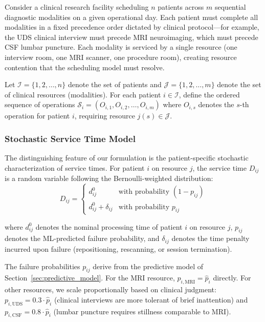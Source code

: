 \documentclass[msom,blindrev]{informs3}
\begin{document}
Consider a clinical research facility scheduling $n$ patients across $m$ sequential diagnostic modalities on a given operational day. Each patient must complete all modalities in a fixed precedence order dictated by clinical protocol---for example, the UDS clinical interview must precede MRI neuroimaging, which must precede CSF lumbar puncture. Each modality is serviced by a single resource (one interview room, one MRI scanner, one procedure room), creating resource contention that the scheduling model must resolve.

Let $\mathcal{I} = \{1, 2, \ldots, n\}$ denote the set of patients and $\mathcal{J} = \{1, 2, \ldots, m\}$ denote the set of clinical resources (modalities). For each patient $i \in \mathcal{I}$, define the ordered sequence of operations $\mathcal{S}_i = (O_{i,1}, O_{i,2}, \ldots, O_{i,m})$ where $O_{i,s}$ denotes the $s$-th operation for patient $i$, requiring resource $j(s) \in \mathcal{J}$.

\subsubsection{Stochastic Service Time Model}

The distinguishing feature of our formulation is the patient-specific stochastic characterization of service times. For patient $i$ on resource $j$, the service time $D_{ij}$ is a random variable following the Bernoulli-weighted distribution:
\begin{equation}
D_{ij} = 
\begin{cases}
d_{ij}^0 & \text{with probability } (1 - p_{ij}) \\
d_{ij}^0 + \delta_{ij} & \text{with probability } p_{ij}
\end{cases}
\label{eq:service_time_rv}
\end{equation}

where $d_{ij}^0$ denotes the nominal processing time of patient $i$ on resource $j$, $p_{ij}$ denotes the ML-predicted failure probability, and $\delta_{ij}$ denotes the time penalty incurred upon failure (repositioning, rescanning, or session termination).

The failure probabilities $p_{ij}$ derive from the predictive model of Section~\ref{sec:predictive_model}. For the MRI resource, $p_{i,\text{MRI}} = \hat{p}_i$ directly. For other resources, we scale proportionally based on clinical judgment: $p_{i,\text{UDS}} = 0.3 \cdot \hat{p}_i$ (clinical interviews are more tolerant of brief inattention) and $p_{i,\text{CSF}} = 0.8 \cdot \hat{p}_i$ (lumbar puncture requires stillness comparable to MRI).
\end{document}
